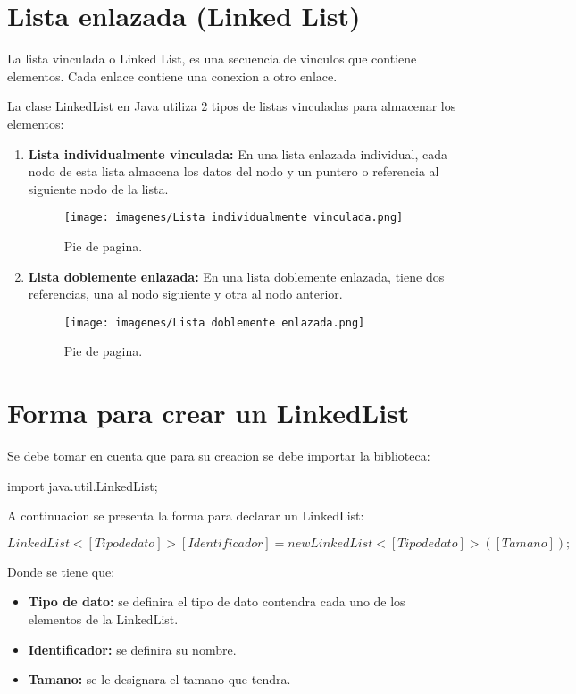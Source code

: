 \documentclass[12pt, letterpaper]{article} %
\begin{document}
\section*{Lista enlazada (Linked List)}
La lista vinculada o Linked List, es una secuencia de vinculos que contiene elementos. Cada enlace contiene una conexion a otro enlace.

La clase LinkedList en Java utiliza 2 tipos de listas vinculadas para almacenar los elementos:
\begin{enumerate}
    \item \textbf{Lista individualmente vinculada:} En una lista enlazada individual, cada nodo de esta lista almacena los datos del nodo y un puntero o referencia al siguiente nodo de la lista.
    \begin{figure}[h]
        \centering
        \texttt{[image: imagenes/Lista individualmente vinculada.png]}
        \caption{Pie de pagina.}
        \label{fig:individual}
    \end{figure}

    \item \textbf{Lista doblemente enlazada:} En una lista doblemente enlazada, tiene dos referencias, una al nodo siguiente y otra al nodo anterior.
    \begin{figure}[h]
        \centering
        \texttt{[image: imagenes/Lista doblemente enlazada.png]}
        \caption{Pie de pagina.}
        \label{fig:doblemente}
    \end{figure}

\end{enumerate}

\section*{Forma para crear un LinkedList}
Se debe tomar en cuenta que para su creacion se debe importar la biblioteca:

\begin{center}
    import java.util.LinkedList;
\end{center}
A continuacion se presenta la forma para declarar un LinkedList:

\begin{center}
    $LinkedList<[Tipo de dato]> [Identificador] = new LinkedList<[Tipo de dato]>([Tamano]);$
\end{center}
Donde se tiene que:
\begin{itemize}
    \item \textbf{Tipo de dato:} se definira el tipo de dato contendra cada uno de los elementos de la LinkedList.
    \item \textbf{Identificador:} se definira su nombre.
    \item \textbf{Tamano:} se le designara el tamano que tendra.
\end{itemize}
\end{document}

